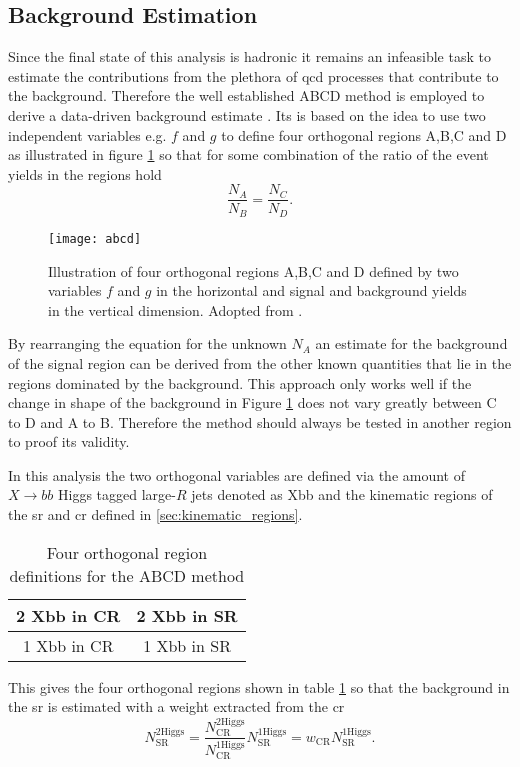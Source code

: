 \subsection{Background Estimation}
Since the final state of this analysis is hadronic it remains an infeasible task to estimate the contributions from the plethora of \ac{qcd} processes that contribute to the background. Therefore the well established ABCD method is employed to derive a data-driven background estimate \citep{buttinger2018background,PhysRevD.103.035021}. Its is based on the idea to use two independent variables e.g. $f$ and $g$ to define four orthogonal regions A,B,C and D as illustrated in figure \ref{fig:abcd} so that for some combination of the ratio of the event yields in the regions hold
\begin{equation}
    \frac{N_A}{N_B}=\frac{N_C}{N_D}.
\end{equation}
\begin{figure}
    \centering
    \texttt{[image: abcd]}
    \caption[]{Illustration of four orthogonal regions A,B,C and D defined by two variables $f$ and $g$ in the horizontal and signal and background yields in the vertical dimension. Adopted from \citep{PhysRevD.103.035021}.}
    \label{fig:abcd}
\end{figure}
By rearranging the equation for the unknown $N_A$ an estimate for the background of the signal region can be derived from the other known quantities that lie in the regions dominated by the background. This approach only works well if the change in shape of the background in Figure \ref{fig:abcd} does not vary greatly between C to D and A to B. Therefore the method should always be tested in another region to proof its validity.

In this analysis the two orthogonal variables are defined via the amount of $X\rightarrow bb$ Higgs tagged large-$R$ jets denoted as Xbb and the kinematic regions of the \ac{sr} and \ac{cr} defined in \ref{sec:kinematic_regions}.
\begin{table}[htbp]
    \centering
    \caption{Four orthogonal region definitions for the ABCD method}
    \begin{tabular}{|c|c|}
        \hline
        2 Xbb in CR & 2 Xbb in SR \\ \hline
        1 Xbb in CR & 1 Xbb in SR \\ \hline
    \end{tabular}
    \label{tab:abcd}
\end{table}
This gives the four orthogonal regions shown in table \ref{tab:abcd} so that the background in the \ac{sr} is estimated with a weight extracted from the \ac{cr}
\begin{equation}
    N_\text{SR}^\text{2Higgs}=\frac{N_\text{CR}^\text{2Higgs}}{N_\text{CR}^\text{1Higgs}} N_\text{SR}^\text{1Higgs} = w_\text{CR} N_\text{SR}^\text{1Higgs}.
\end{equation}

